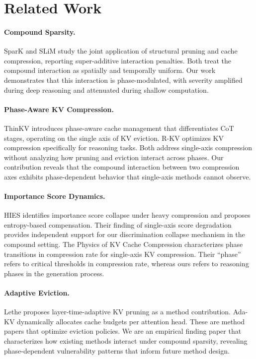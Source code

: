 \documentclass[11pt,a4paper]{article}
\begin{document}
\section{Related Work}

\paragraph{Compound Sparsity.}
SparK \citep{spark2024} and SLiM \citep{slim2024} study the joint application of structural pruning and cache compression, reporting super-additive interaction penalties. Both treat the compound interaction as spatially and temporally uniform. Our work demonstrates that this interaction is phase-modulated, with severity amplified during deep reasoning and attenuated during shallow computation.

\paragraph{Phase-Aware KV Compression.}
ThinKV \citep{thinkv2025} introduces phase-aware cache management that differentiates CoT stages, operating on the single axis of KV eviction. R-KV \citep{rkv2025} optimizes KV compression specifically for reasoning tasks. Both address single-axis compression without analyzing how pruning and eviction interact across phases. Our contribution reveals that the compound interaction between two compression axes exhibits phase-dependent behavior that single-axis methods cannot observe.

\paragraph{Importance Score Dynamics.}
HIES \citep{hies2025} identifies importance score collapse under heavy compression and proposes entropy-based compensation. Their finding of single-axis score degradation provides independent support for our discrimination collapse mechanism in the compound setting. The Physics of KV Cache Compression \citep{physics_kv2026} characterizes phase transitions in compression rate for single-axis KV compression. Their ``phase'' refers to critical thresholds in compression rate, whereas ours refers to reasoning phases in the generation process.

\paragraph{Adaptive Eviction.}
Lethe \citep{lethe2026} proposes layer-time-adaptive KV pruning as a method contribution. Ada-KV \citep{adakv2024} dynamically allocates cache budgets per attention head. These are method papers that optimize eviction policies. We are an empirical finding paper that characterizes how existing methods interact under compound sparsity, revealing phase-dependent vulnerability patterns that inform future method design.
\end{document}
